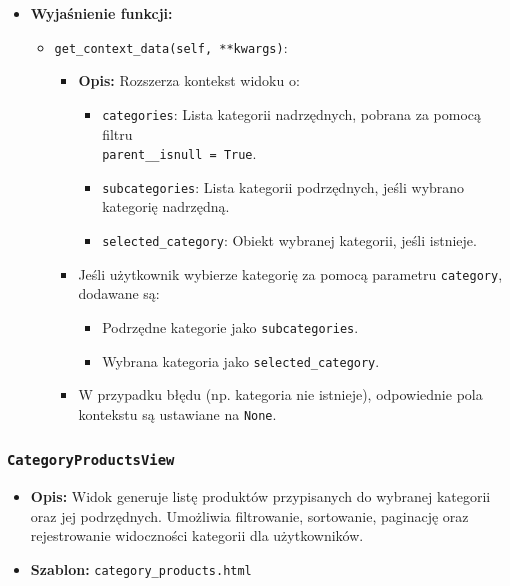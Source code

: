 \documentclass[12pt,a4paper,oneside]{article}
\theoremstyle{definition}
\numberwithin{equation}{section}
\begin{document}
\begin{itemize}
    \item \textbf{Wyjaśnienie funkcji:}
    \begin{itemize}
        \item \texttt{get\_context\_data(self, **kwargs)}:
        \begin{itemize}
            \item \textbf{Opis:} Rozszerza kontekst widoku o:
            \begin{itemize}
                \item \texttt{categories}: Lista kategorii nadrzędnych, pobrana za pomocą filtru\\ \texttt{parent\_\_isnull = True}.
                \item \texttt{subcategories}: Lista kategorii podrzędnych, jeśli wybrano kategorię nadrzędną.
                \item \texttt{selected\_category}: Obiekt wybranej kategorii, jeśli istnieje.
            \end{itemize}
            \item Jeśli użytkownik wybierze kategorię za pomocą parametru \texttt{category}, dodawane są:
            \begin{itemize}
                \item Podrzędne kategorie jako \texttt{subcategories}.
                \item Wybrana kategoria jako \texttt{selected\_category}.
            \end{itemize}
            \item W przypadku błędu (np. kategoria nie istnieje), odpowiednie pola kontekstu są ustawiane na \texttt{None}.
        \end{itemize}
    \end{itemize}
\end{itemize}


\label{CategoryProductsView}
\subsubsection*{\texttt{CategoryProductsView}}
\begin{itemize}
    \item \textbf{Opis:} Widok generuje listę produktów przypisanych do wybranej kategorii oraz jej podrzędnych. Umożliwia filtrowanie, sortowanie, paginację oraz rejestrowanie widoczności kategorii dla użytkowników.
    \item \textbf{Szablon:} \texttt{category\_products.html}
\end{itemize}
\end{document}
